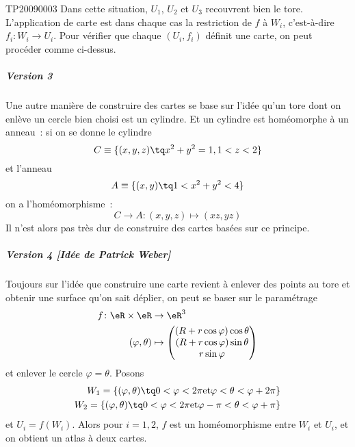 \begin{corrige}{TP20090003}
Dans cette situation, $U_1$, $U_2$ et $U_3$ recouvrent bien le
tore. L'application de carte est dans chaque cas la restriction de $f$
à $W_i$, c'est-à-dire $f_i : W_i \to
U_i$. Pour vérifier que chaque $(U_i,f_i)$ définit une carte, on peut
procéder comme ci-dessus.

\subparagraph{Version 3}
Une autre manière de construire des cartes se base sur l'idée qu'un
tore dont on enlève un cercle bien choisi est un cylindre. Et un
cylindre est homéomorphe à un anneau~: si on se donne le cylindre
\begin{equation*}
  C \equiv \{ (x,y,z) \tq x^2 + y^2 = 1, 1 < z < 2 \}
\end{equation*}
et l'anneau
\begin{equation*}
  A \equiv \{ (x,y) \tq 1 < x^2 + y^2 < 4 \}
\end{equation*}
on a l'homéomorphisme~:
\begin{equation*}
  C \to A : (x,y,z) \mapsto (x z, y z)
\end{equation*}
Il n'est alors pas très dur de construire des cartes basées sur ce
principe.

\subparagraph{Version 4 [Idée de Patrick Weber]}
Toujours sur l'idée que construire une carte revient à enlever des
points au tore et obtenir une surface qu'on sait déplier, on peut se
baser sur le paramétrage 
\begin{equation}
	\begin{aligned}
		f\colon \eR\times\eR&\to \eR^3 \\
		(\varphi,\theta)&\mapsto \begin{pmatrix}
			(R+r\cos\varphi)\cos\theta	\\ 
			(R+r\cos\varphi)\sin\theta	\\ 
			r\sin\varphi	
		\end{pmatrix}
	\end{aligned}
\end{equation}
et enlever le cercle $\varphi=\theta$. Posons
\begin{equation*}
  \begin{split}
    W_1 = \{ (\varphi,\theta) \tq 0 < \varphi < 2\pi \text{et}
    \varphi
    < \theta < \varphi + 2\pi \}\\
    W_2 = \{ (\varphi,\theta) \tq 0 < \varphi < 2\pi \text{et}
    \varphi - \pi < \theta < \varphi + \pi \}
  \end{split}
\end{equation*}
et $U_i = f(W_i)$. Alors pour $i = 1, 2$, $f$ est un homéomorphisme entre $W_i$ et
$U_i$, et on obtient un atlas à deux cartes.


\end{corrige}
